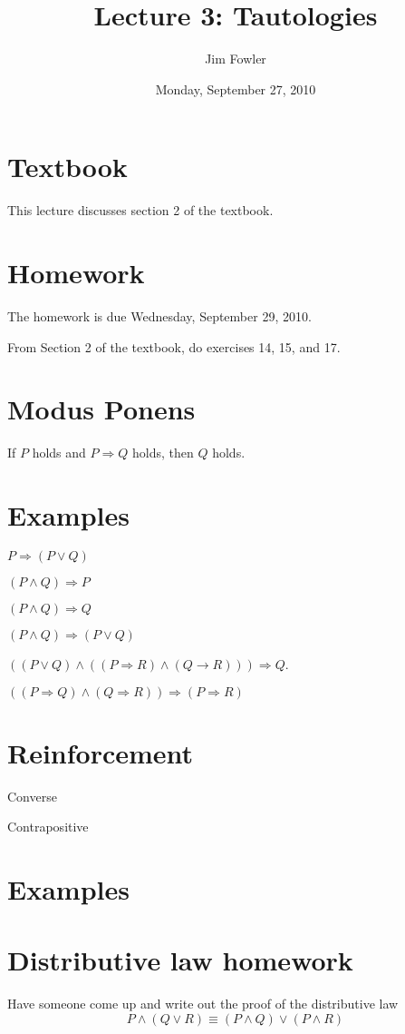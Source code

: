 \documentclass[12pt]{handout}
\title{Lecture 3: Tautologies}
\author{Jim Fowler}
\date{Monday, September 27, 2010}
\begin{document}
\maketitle

\section*{Textbook}

This lecture discusses section 2 of the textbook.

\section*{Homework}

The homework is due Wednesday, September 29, 2010.

From Section 2 of the textbook, do exercises 14, 15, and 17.

\section*{Modus Ponens}

If $P$ holds and $P \Rightarrow Q$ holds, then $Q$ holds.

\section*{Examples}

$P \Rightarrow (P \vee Q)$

$(P \wedge Q) \Rightarrow P$

$(P \wedge Q) \Rightarrow Q$

$(P \wedge Q) \Rightarrow (P \vee Q)$

$((P \vee Q) \wedge ((P \Rightarrow R) \wedge (Q \rightarrow R))) \Rightarrow Q$.

$\left( (P \Rightarrow Q) \wedge (Q \Rightarrow R) \right) \Rightarrow (P \Rightarrow R)$

\section*{Reinforcement}

Converse

Contrapositive

\section*{Examples}

\section*{Distributive law homework}

Have someone come up and write out the proof of the distributive law
$$
P \wedge (Q \vee R) \equiv (P \wedge Q) \vee (P \wedge R)
$$
\end{document}
